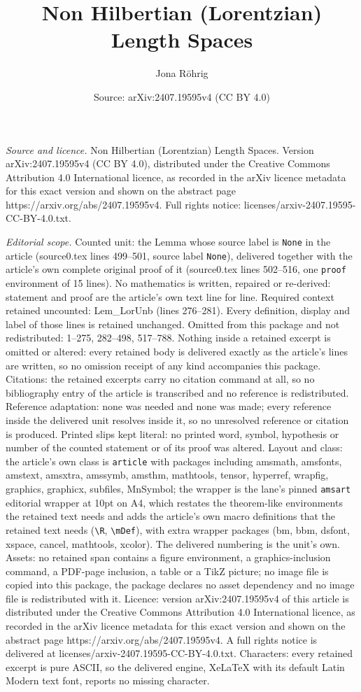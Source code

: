 \documentclass[10pt,a4paper]{amsart}
\title[Non Hilbertian (Lorentzian) Length Spaces]{Non Hilbertian (Lorentzian) Length Spaces}
\author{Jona R\"ohrig}
\date{Source: arXiv:2407.19595v4 (CC BY 4.0)}
\begin{document}
\maketitle

\noindent\emph{Source and licence.} Non Hilbertian (Lorentzian) Length Spaces. Version arXiv:2407.19595v4 (CC BY 4.0), distributed under the Creative Commons Attribution 4.0 International licence, as recorded in the arXiv licence metadata for this exact version and shown on the abstract page https://arxiv.org/abs/2407.19595v4. Full rights notice: licenses/arxiv-2407.19595-CC-BY-4.0.txt.\par\smallskip

\noindent\textit{Editorial scope.} Counted unit: the Lemma whose source label is \texttt{None} in the article (source0.tex lines 499--501, source label \texttt{None}), delivered together with the article's own complete original proof of it (source0.tex lines 502--516, one \texttt{proof} environment of 15 lines). No mathematics is written, repaired or re-derived: statement and proof are the article's own text line for line. Required context retained uncounted: Lem\_LorUnb (lines 276--281). Every definition, display and label of those lines is retained unchanged. Omitted from this package and not redistributed: 1--275, 282--498, 517--788. Nothing inside a retained excerpt is omitted or altered: every retained body is delivered exactly as the article's lines are written, so no omission receipt of any kind accompanies this package. Citations: the retained excerpts carry no citation command at all, so no bibliography entry of the article is transcribed and no reference is redistributed. Reference adaptation: none was needed and none was made; every reference inside the delivered unit resolves inside it, so no unresolved reference or citation is produced. Printed slips kept literal: no printed word, symbol, hypothesis or number of the counted statement or of its proof was altered. Layout and class: the article's own class is \texttt{article} with packages including amsmath, amsfonts, amstext, amsxtra, amssymb, amsthm, mathtools, tensor, hyperref, wrapfig, graphics, graphicx, subfiles, MnSymbol; the wrapper is the lane's pinned \texttt{amsart} editorial wrapper at 10pt on A4, which restates the theorem-like environments the retained text needs and adds the article's own macro definitions that the retained text needs (\texttt{\textbackslash R}, \texttt{\textbackslash mDef}), with extra wrapper packages (bm, bbm, dsfont, xspace, cancel, mathtools, xcolor). The delivered numbering is the unit's own. Assets: no retained span contains a figure environment, a graphics-inclusion command, a PDF-page inclusion, a table or a TikZ picture; no image file is copied into this package, the package declares no asset dependency and no image file is redistributed with it. Licence: version arXiv:2407.19595v4 of this article is distributed under the Creative Commons Attribution 4.0 International licence, as recorded in the arXiv licence metadata for this exact version and shown on the abstract page https://arxiv.org/abs/2407.19595v4. A full rights notice is delivered at licenses/arxiv-2407.19595-CC-BY-4.0.txt. Characters: every retained excerpt is pure ASCII, so the delivered engine, XeLaTeX with its default Latin Modern text font, reports no missing character.
\end{document}
